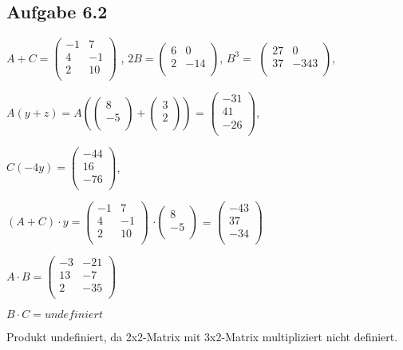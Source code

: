 \documentclass{standalone}
\begin{document}
\subsection{Aufgabe 6.2}
$A + C =  
	\left(\begin{array}{rrr} 
		-1 & 7 \\
		4 & -1 \\
		2 & 10 \\
	\end{array}\right)$
	, $ 2B = \left(\begin{array}{rr}
		6 & 0 \\
		2 & -14\\
	\end{array}\right)$, 
	$B^3=$ $\left(\begin{array}{rr}
		27 & 0 \\
		37 & -343 \\
	\end{array}\right)$,

 
	$A(y+z)= A \left(\left(\begin{array}{r}
		8\\
		-5\\
		\end{array}\right) +
	\left(\begin{array}{r}
		3\\
		2\\
		\end{array}\right)\right)$ =
	$\left(\begin{array}{r}
		-31\\
		41\\
		-26\\
		\end{array}\right)$,
	
	
	$C(-4y)=
	\left(\begin{array}{r}
		-44\\
		 16\\
		-76\\
	\end{array}\right)$,


	$(A+C)\cdot y =	
	\left(\begin{array}{rr}
		-1 & 7 \\
		4 & -1 \\
		2 & 10 \\
	\end{array}\right)$	
		$\cdot
	 \left(\begin{array}{r}
	 	8\\
	 	-5\\
	 \end{array}\right)$ = 
  $ \left(\begin{array}{r}
  	-43\\
  	37\\
  	-34\\
  \end{array}\right)$


	$A \cdot B = 
	\left(\begin{array}{rr}
		-3 & -21 \\
		13 & -7 \\
		2 & -35 \\
	\end{array}\right)$

	$B\cdot C = undefiniert $ 
	
	
	Produkt undefiniert, da 2x2-Matrix mit 3x2-Matrix multipliziert nicht definiert. 
\end{document}
